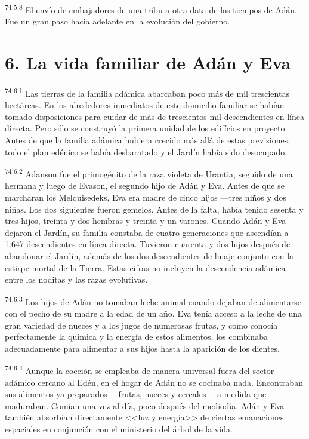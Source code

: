 \par
\textsuperscript{74:5.8} El envío de embajadores de una tribu a otra data de los tiempos de Adán. Fue un gran paso hacia adelante en la evolución del gobierno.

\section*{6. La vida familiar de Adán y Eva}
\par
\textsuperscript{74:6.1} Las tierras de la familia adámica abarcaban poco más de mil trescientas hectáreas. En los alrededores inmediatos de este domicilio familiar se habían tomado disposiciones para cuidar de más de trescientos mil descendientes en línea directa. Pero sólo se construyó la primera unidad de los edifícios en proyecto. Antes de que la familia adámica hubiera crecido más allá de estas previsiones, todo el plan edénico se había desbaratado y el Jardín había sido desocupado.

\par
\textsuperscript{74:6.2} Adanson fue el primogénito de la raza violeta de Urantia, seguido de una hermana y luego de Evason, el segundo hijo de Adán y Eva. Antes de que se marcharan los Melquisedeks, Eva era madre de cinco hijos ---tres niños y dos niñas. Los dos siguientes fueron gemelos. Antes de la falta, había tenido sesenta y tres hijos, treinta y dos hembras y treinta y un varones. Cuando Adán y Eva dejaron el Jardín, su familia constaba de cuatro generaciones que ascendían a 1.647 descendientes en línea directa. Tuvieron cuarenta y dos hijos después de abandonar el Jardín, además de los dos descendientes de linaje conjunto con la estirpe mortal de la Tierra. Estas cifras no incluyen la descendencia adámica entre los noditas y las razas evolutivas.

\par
\textsuperscript{74:6.3} Los hijos de Adán no tomaban leche animal cuando dejaban de alimentarse con el pecho de su madre a la edad de un año. Eva tenía acceso a la leche de una gran variedad de nueces y a los jugos de numerosas frutas, y como conocía perfectamente la química y la energía de estos alimentos, los combinaba adecuadamente para alimentar a sus hijos hasta la aparición de los dientes.

\par
\textsuperscript{74:6.4} Aunque la cocción se empleaba de manera universal fuera del sector adámico cercano al Edén, en el hogar de Adán no se cocinaba nada. Encontraban sus alimentos ya preparados ---frutas, nueces y cereales--- a medida que maduraban. Comían una vez al día, poco después del mediodía. Adán y Eva también absorbían directamente <<luz y energía>> de ciertas emanaciones espaciales en conjunción con el ministerio del árbol de la vida.

